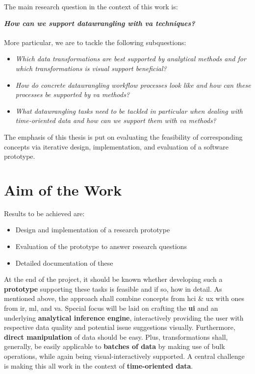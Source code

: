 The main research question in the context of this work is:

\textbf{\emph{How can we support \gls{datawrangling} with \gls{va} techniques?}}
\\\\
More particular, we are to tackle the following subquestions:

\begin{itemize}
  \item \emph{Which data transformations are best supported by analytical methods and for which transformations is visual support beneficial?}
  \item \emph{How do concrete \gls{datawrangling} workflow processes look like and how can these processes be supported by \gls{va} methods?}
  \item \emph{What \gls{datawrangling} tasks need to be tackled in particular when dealing with time-oriented data and how can we support them with \gls{va} methods?}
\end{itemize}

The emphasis of this thesis is put on evaluating the feasibility of corresponding concepts via iterative design, implementation, and evaluation of a software prototype.


\section{Aim of the Work}

Results to be achieved are:

\begin{itemize}
  \item Design and implementation of a research prototype
  \item Evaluation of the prototype to answer research questions
  \item Detailed documentation of these
\end{itemize}

At the end of the project, it should be known whether developing such a \textbf{prototype} supporting these tasks is feasible and if so, how in detail.
As mentioned above, the approach shall combine concepts from \gls{hci} \& \gls{ux} with ones from \gls{ir}, \gls{ml}, and \gls{va}.
Special focus will be laid on crafting the \textbf{\gls{ui}} and an underlying \textbf{analytical inference engine}, interactively providing the user with respective data quality and potential issue suggestions visually. Furthermore, \textbf{direct manipulation} of data should be easy.
Plus, transformations shall, generally, be easily applicable to \textbf{batches of data} by making use of bulk operations, while again being visual-interactively supported.
A central challenge is making this all work in the context of \textbf{time-oriented data}.

